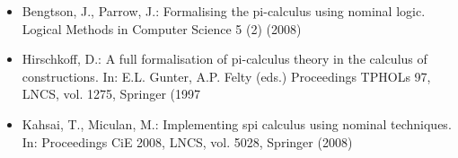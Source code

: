 \begin{itemize}
\item
Bengtson, J., Parrow, J.: Formalising the pi-calculus using nominal logic. Logical Methods in Computer
Science
5
(2) (2008)


\item 
  Hirschkoff, D.: A full formalisation of pi-calculus theory in the calculus of constructions. In: E.L. Gunter,
A.P. Felty (eds.) Proceedings TPHOLs 97,
LNCS, vol. 1275,  Springer (1997


\item 
Kahsai, T., Miculan, M.: Implementing spi calculus using nominal techniques. In: 
 Proceedings CiE 2008,
LNCS, vol. 5028, Springer (2008)
\end{itemize}
 

